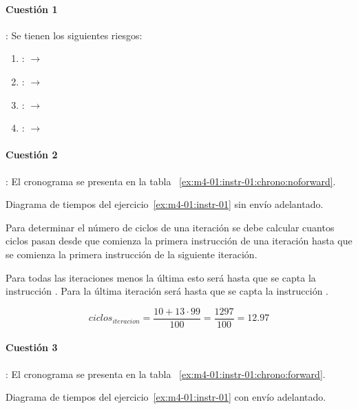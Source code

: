 \paragraph{Cuestión 1}: Se tienen los siguientes riesgos:

\begin{enumerate}
  \item {}:  $\rightarrow$ 
  \item {}:  $\rightarrow$ 
  \item {}:  $\rightarrow$ 
  \item {}:  $\rightarrow$ 
\end{enumerate}

\paragraph{Cuestión 2}: El cronograma se presenta en la tabla ~\ref{ex:m4-01:instr-01:chrono:noforward}.

\begin{table}[htb]

\caption{Diagrama de tiempos del ejercicio~\ref{ex:m4-01:instr-01} sin envío adelantado.}
\label{ex:m4-01:instr-01:chrono:noforward}
\end{table}

Para determinar el número de ciclos de una iteración se debe calcular cuantos ciclos
pasan desde que comienza la primera instrucción de una iteración hasta que se comienza
la primera instrucción de la siguiente iteración.

Para todas las iteraciones menos la última esto será hasta que se capta la
instrucción . Para la última iteración será hasta que se capta la
instrucción .

\[
ciclos_{iteracion} = \frac{10 + 13 \cdot 99}{100} = \frac{1297}{100} = 12.97
\]

\paragraph{Cuestión 3}: El cronograma se presenta en la tabla ~\ref{ex:m4-01:instr-01:chrono:forward}.

\begin{table}[htb]

\caption{Diagrama de tiempos del ejercicio~\ref{ex:m4-01:instr-01} con envío adelantado.}
\label{ex:m4-01:instr-01:chrono:forward}
\end{table}


